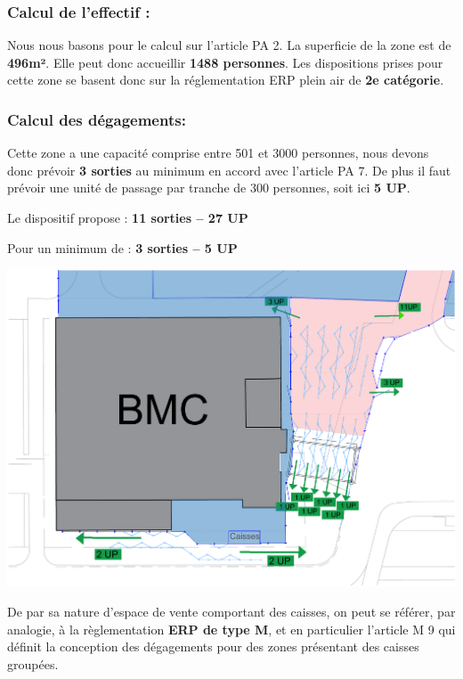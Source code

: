 \documentclass[hidelinks, paper=a4, fontsize=13pt]{report}
\begin{document}
\subsubsection{Calcul de l’effectif :}
Nous nous basons pour le calcul sur l’article PA 2. La superficie de la zone est de \textbf{496m²}. Elle peut donc accueillir \textbf{1488 personnes}. Les dispositions prises pour cette zone se basent donc sur la réglementation ERP plein air de \textbf{2e catégorie}. \\
\subsubsection{Calcul des dégagements:}
Cette zone a une capacité comprise entre 501 et 3000 personnes, nous devons donc prévoir \textbf{3 sorties} au minimum en accord avec l’article PA 7. De plus il faut prévoir une unité de passage par tranche de 300 personnes, soit ici \textbf{5 UP}. 
\begin{center}
	Le dispositif propose :        \textbf{11 sorties – 27 UP}
	
	Pour un minimum de :         \textbf{ 3 sorties – 5 UP}
\end{center}

\begin{center}
	\includegraphics[width=.8\textwidth,keepaspectratio]{Exports/Plan_24h_44eme-Entree_IS}
\end{center}

De par sa nature d’espace de vente comportant des caisses, on peut se référer, par analogie, à la règlementation \textbf{ERP de type M}, et en particulier l’article M 9 qui définit la conception des dégagements pour des zones présentant des caisses groupées. \\
\end{document}
